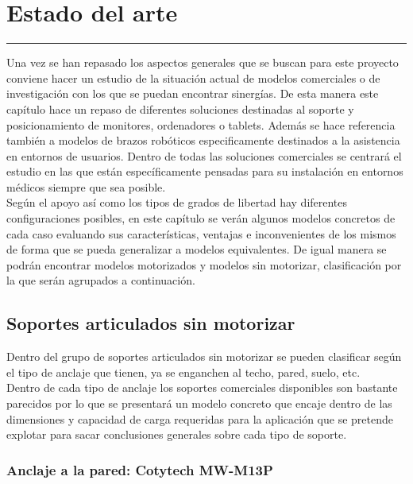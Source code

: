 \chapter{Estado del arte} \label{chap:estadoarte}
\hrule
\vspace{3mm}

Una vez se han repasado los aspectos generales que se buscan para este proyecto conviene hacer un estudio de la situación actual de modelos comerciales o de investigación con los que se puedan encontrar sinergías. De esta manera este capítulo hace un repaso de diferentes soluciones destinadas al soporte y posicionamiento de monitores, ordenadores o tablets. Además se hace referencia también a modelos de brazos robóticos especificamente destinados a la asistencia en entornos de usuarios. Dentro de todas las soluciones comerciales se centrará el estudio en las que están específicamente pensadas para su instalación en entornos médicos siempre que sea posible.
\\

Según el apoyo así como los tipos de grados de libertad hay diferentes configuraciones posibles, en este capítulo se verán algunos modelos concretos de cada caso evaluando sus características, ventajas e inconvenientes de los mismos de forma que se pueda generalizar a modelos equivalentes. De igual manera se podrán encontrar modelos motorizados y modelos sin motorizar, clasificación por la que serán agrupados a continuación.
\\

\section{Soportes articulados sin motorizar}

Dentro del grupo de soportes articulados sin motorizar se pueden clasificar según el tipo de anclaje que tienen, ya se enganchen al techo, pared, suelo, etc.
\\

Dentro de cada tipo de anclaje los soportes comerciales disponibles son bastante parecidos por lo que se presentará un modelo concreto que encaje dentro de las dimensiones y capacidad de carga requeridas para la aplicación que se pretende explotar para sacar conclusiones generales sobre cada tipo de soporte.
\\

\subsection{Anclaje a la pared: Cotytech MW-M13P}

